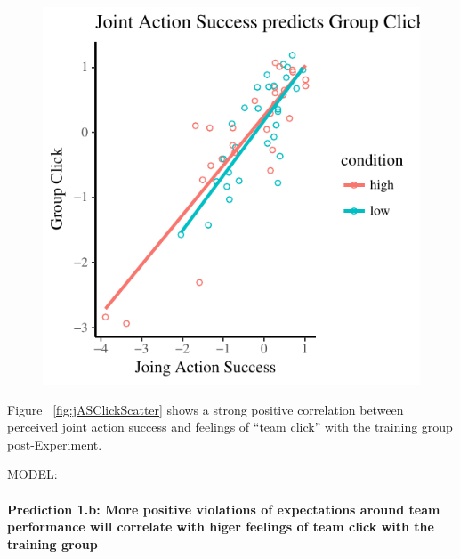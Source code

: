 \documentclass[english]{article}\usepackage[]{graphicx}\usepackage[]{color}
\makeatletter
\def\maxwidth{ %
  \ifdim\Gin@nat@width>\linewidth
    \linewidth
  \else
    \Gin@nat@width
  \fi
}
\newenvironment{knitrout}{}{} %
\newcommand{\myparagraph}[1]{\paragraph{#1}\mbox{}\\}
\makeatother
\begin{document}
\begin{knitrout}
\begin{figure}
{\centering \includegraphics[width=\maxwidth]{figure/jASClickScatter-1} 

}

\end{figure}


\end{knitrout}

Figure ~\ref{fig:jASClickScatter} shows a strong positive correlation between perceived joint action success and feelings of ``team click'' with the training group post-Experiment.

MODEL:


\myparagraph{Prediction 1.b: More positive violations of expectations around team performance will correlate with higer feelings of team click with the training group}
\end{document}
